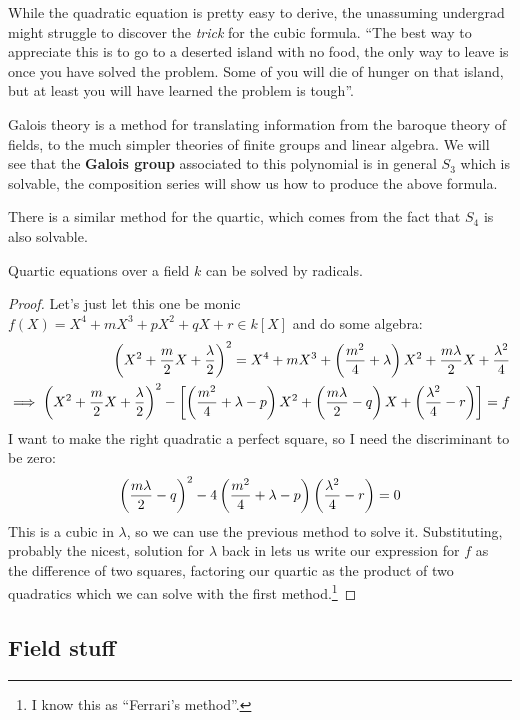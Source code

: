 \documentclass{article}
\begin{document}
While the quadratic equation is pretty easy to derive, the unassuming undergrad might struggle to discover the \textit{trick} for the cubic formula. ``The best way to appreciate this is to go to a deserted island with no food, the only way to leave is once you have solved the problem. Some of you will die of hunger on that island, but at least you will have learned the problem is tough''.

Galois theory is a method for translating information from the baroque theory of fields, to the much simpler theories of finite groups and linear algebra. We will see that the \textbf{Galois group} associated to this polynomial is in general $S_3$ which is solvable, the composition series will show us how to produce the above formula.

There is a similar method for the quartic, which comes from the fact that $S_4$ is also solvable.

\begin{proposition}
    Quartic equations over a field $k$ can be solved by radicals.
    \begin{proof}
        Let's just let this one be monic $f(X) = X^4+mX^3 + pX^2 + qX + r \in k[X]$ and do some algebra: \begin{align*}
            \left( X^2+\frac{m}{2}X + \frac{\lambda}{2} \right)^2 = X^4 + mX^3 + \left( \frac{m^2}{4} + \lambda \right)X^2 + \frac{m\lambda}{2}X + \frac{\lambda^2}{4}\\
            \implies \left( X^2+\frac{m}{2}X + \frac{\lambda}{2} \right)^2 - \left[ \left( \frac{m^2}{4}+\lambda - p \right)X^2 + \left( \frac{m\lambda}{2}-q \right)X + \left( \frac{\lambda^2}{4} - r \right) \right] = f
        \end{align*}
        I want to make the right quadratic a perfect square, so I need the discriminant to be zero: \[
        \left( \frac{m\lambda}{2}-q \right)^2 - 4\left( \frac{m^2}{4}+\lambda - p \right)\left( \frac{\lambda^2}{4} - r \right) = 0
        \] This is a cubic in $\lambda$, so we can use the previous method to solve it. Substituting, probably the nicest, solution for $\lambda$ back in lets us write our expression for $f$ as the difference of two squares, factoring our quartic as the product of two quadratics which we can solve with the first method.\footnote{I know this as ``Ferrari's method''.}
    \end{proof}
\end{proposition}

\subsection{Field stuff}
\end{document}
